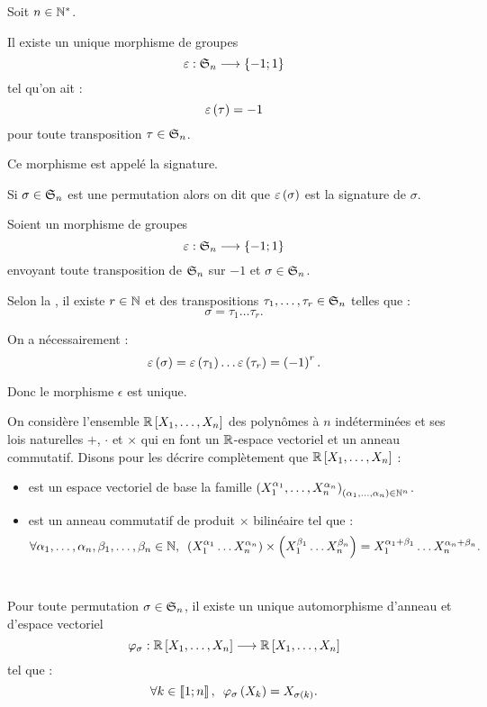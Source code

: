 \begin{deftheo}[Signature]
Soit \(n\in\Ns\).

Il existe un unique morphisme de groupes \[\epsilon:\S{n}\to\accol{-1;1}\] tel qu'on ait : \[\epsilon\paren{\tau}=-1\] pour toute transposition \(\tau\in\S{n}\).

Ce morphisme est appelé la signature.

Si \(\sigma\in\S{n}\) est une permutation alors on dit que \(\epsilon\paren{\sigma}\) est la signature de \(\sigma\).
\end{deftheo}

\begin{dem}

\unicite

Soient un morphisme de groupes \[\epsilon:\S{n}\to\accol{-1;1}\] envoyant toute transposition de \(\S{n}\) sur \(-1\) et \(\sigma\in\S{n}\).

Selon la , il existe \(r\in\N\) et  des transpositions \(\tau_1,\dots,\tau_r\in\S{n}\) telles que : \[\sigma=\tau_1\dots\tau_r.\]

On a nécessairement : \[\epsilon\paren{\sigma}=\epsilon\paren{\tau_1}\dots\epsilon\paren{\tau_r}=\paren{-1}^r.\]

Donc le morphisme \(\epsilon\) est unique.

\existence\newcommand{\polys}{\poly[\R][X_1,\dots,X_n]}

On considère l'ensemble \(\polys\) des polynômes à \(n\) indéterminées et ses lois naturelles \(+\), \(\cdot\) et \(\times\) qui en font un \(\R\)-espace vectoriel et un anneau commutatif. Disons pour les décrire complètement que \(\polys\) : \begin{itemize}
    \item est un espace vectoriel de base la famille \(\paren{X_1^{\alpha_1},\dots,X_n^{\alpha_n}}_{\paren{\alpha_1,\dots,\alpha_n}\in\N^n}\).
    \item est un anneau commutatif de produit \(\times\) bilinéaire tel que : \[\quantifs{\forall\alpha_1,\dots,\alpha_n,\beta_1,\dots,\beta_n\in\N}\paren{X_1^{\alpha_1}\dots X_n^{\alpha_n}}\times\paren{X_1^{\beta_1}\dots X_n^{\beta_n}}=X_1^{\alpha_1+\beta_1}\dots X_n^{\alpha_n+\beta_n}.\]~
\end{itemize}

Pour toute permutation \(\sigma\in\S{n}\), il existe un unique automorphisme d'anneau et d'espace vectoriel \[\phi_\sigma:\polys\to\polys\] tel que : \[\quantifs{\forall k\in\interventierii{1}{n}}\phi_\sigma\paren{X_k}=X_{\sigma\paren{k}}.\]


\end{dem}

